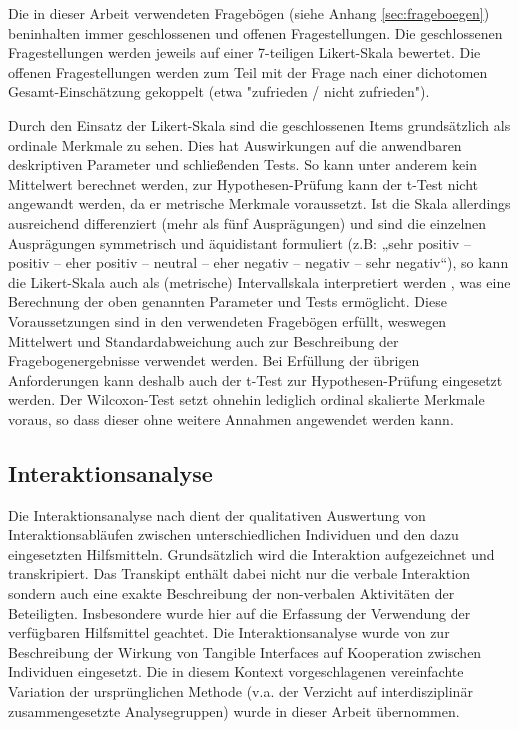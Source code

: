 Die in dieser Arbeit verwendeten Fragebögen (siehe Anhang \ref{sec:frageboegen}) beninhalten immer geschlossenen und offenen Fragestellungen. Die geschlossenen Fragestellungen werden jeweils auf einer 7-teiligen Likert-Skala bewertet. Die offenen Fragestellungen werden zum Teil mit der Frage nach einer dichotomen Gesamt-Einschätzung gekoppelt (etwa "zufrieden / nicht zufrieden").

Durch den Einsatz der Likert-Skala sind die geschlossenen Items grundsätzlich als ordinale Merkmale zu sehen. Dies hat Auswirkungen auf die anwendbaren deskriptiven Parameter und schließenden Tests. So kann unter anderem kein Mittelwert berechnet werden, zur Hypothesen-Prüfung kann der t-Test nicht angewandt werden, da er metrische Merkmale voraussetzt. Ist die Skala allerdings ausreichend differenziert (mehr als fünf Ausprägungen) und sind die einzelnen Ausprägungen symmetrisch und äquidistant formuliert (z.B: „sehr positiv -- positiv -- eher positiv -- neutral -- eher negativ -- negativ -- sehr negativ“), so kann die Likert-Skala auch als (metrische) Intervallskala interpretiert werden \citep[][S. 222f]{Bortz03}, was eine Berechnung der oben genannten Parameter und Tests ermöglicht. Diese Voraussetzungen sind in den verwendeten Fragebögen erfüllt, weswegen Mittelwert und Standardabweichung auch zur Beschreibung der Fragebogenergebnisse verwendet werden. Bei Erfüllung der übrigen Anforderungen kann deshalb auch der t-Test zur Hypothesen-Prüfung eingesetzt werden. Der Wilcoxon-Test setzt ohnehin lediglich ordinal skalierte Merkmale voraus, so dass dieser ohne weitere Annahmen angewendet werden kann.


\subsection{Interaktionsanalyse} %
\label{sub:interaktionsanalyse}

Die Interaktionsanalyse nach \citet{Jordan95} dient der qualitativen Auswertung von Interaktionsabläufen zwischen unterschiedlichen Individuen und den dazu eingesetzten Hilfsmitteln. Grundsätzlich wird die Interaktion aufgezeichnet und transkripiert. Das Transkipt enthält dabei nicht nur die verbale Interaktion sondern auch eine exakte Beschreibung der non-verbalen Aktivitäten der Beteiligten. Insbesondere wurde hier auf die Erfassung der Verwendung der verfügbaren Hilfsmittel geachtet. Die Interaktionsanalyse wurde von \citet{Hornecker04} zur Beschreibung der Wirkung von Tangible Interfaces auf Kooperation zwischen Individuen eingesetzt. Die in diesem Kontext vorgeschlagenen vereinfachte Variation der ursprünglichen Methode (v.a. der Verzicht auf interdisziplinär zusammengesetzte Analysegruppen) wurde in dieser Arbeit übernommen. 

